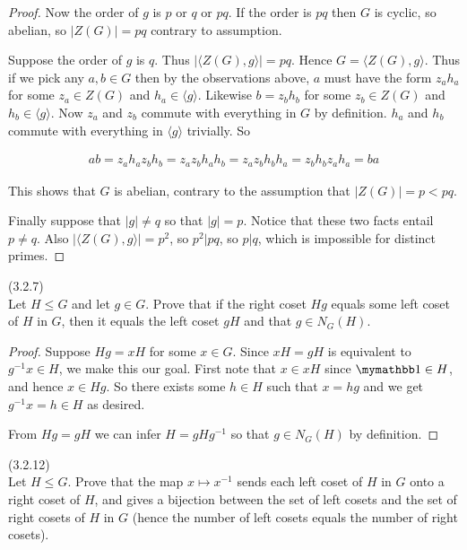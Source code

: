 \documentclass{exam}
\begin{document}
\begin{questions}
\begin{proof}
  Now the order of $g$ is $p$ or $q$ or $pq$.  If the order is $pq$ then $G$ is cyclic, so abelian, so $|Z(G)|=pq$ contrary to assumption.

  Suppose the order of $g$ is $q$.  Thus $|\langle Z(G),g\rangle|= pq$.  Hence $G = \langle Z(G),g\rangle$.  Thus if we pick any $a,b\in G$ then by the observations above, $a$ must have the form $z_ah_a$ for some $z_a\in Z(G)$ and $h_a\in \langle g\rangle$. Likewise $b=z_bh_b$ for some $z_b\in Z(G)$ and $h_b\in \langle g \rangle$.   Now $z_a$ and $z_b$ commute with everything in $G$ by definition.  $h_a$ and $h_b$ commute with everything in $\langle g\rangle$ trivially.  So

  \begin{align*}
    ab = z_ah_az_bh_b = z_az_bh_ah_b = z_az_bh_bh_a = z_bh_bz_ah_a = ba
  \end{align*}

  This shows that $G$ is abelian, contrary to the assumption that $|Z(G)|=p<pq$.

  Finally suppose that $|g|\ne q$ so that $|g|=p$.  Notice that these two facts entail $p\ne q$.  Also $|\langle Z(G),g\rangle|=p^2$, so $p^2 | pq$, so $p|q$, which is impossible for distinct primes.
\end{proof}

\question(3.2.7)\\
Let $H\leq G$ and let $g\in G$.  Prove that if the right coset $Hg$ equals some left coset of $H$ in $G$, then it equals the left coset $gH$ and that $g\in N_G(H)$.

\begin{proof}
  Suppose $Hg = xH$ for some $x\in G$.  Since $xH = gH$ is equivalent to $g^{-1}x\in H$, we make this our goal.  First note that $x\in xH$ since $\mymathbb 1 \in H$, and hence $x\in Hg$.  So there exists some $h\in H$ such that $x=hg$ and we get $g^{-1}x = h\in H$ as desired.

  \vspace{1cm}

  From $Hg=gH$ we can infer $H=gHg^{-1}$ so that $g\in N_G(H)$ by definition.
\end{proof}

\question(3.2.12)\\
Let $H\leq G$.  Prove that the map $x\mapsto x^{-1}$ sends each left coset of $H$ in $G$ onto a right coset of $H$, and gives a bijection between the set of left cosets and the set of right cosets of $H$ in $G$ (hence the number of left cosets equals the number of right cosets).


\end{questions}
\end{document}
